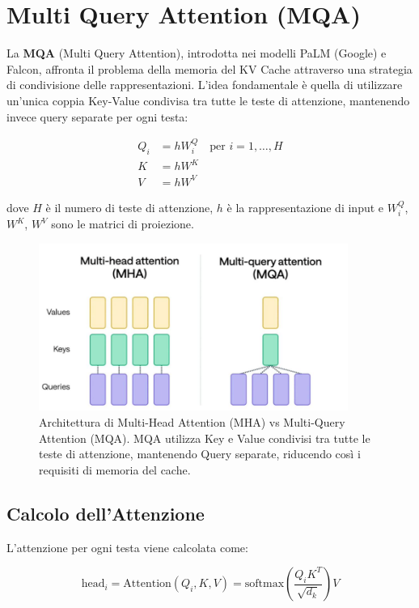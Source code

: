 \section{Multi Query Attention (MQA)}

La \textbf{MQA} (Multi Query Attention), introdotta nei modelli PaLM (Google) e Falcon, affronta il problema della memoria del KV Cache attraverso una strategia di condivisione delle rappresentazioni. L'idea fondamentale è quella di utilizzare un'unica coppia Key-Value condivisa tra tutte le teste di attenzione, mantenendo invece query separate per ogni testa:

\begin{align*}
Q_i &= h W_i^Q \quad \text{per } i = 1, \ldots, H \\
K &= h W^K \\
V &= h W^V
\end{align*}

dove $H$ è il numero di teste di attenzione, $h$ è la rappresentazione di input e $W_i^Q$, $W^K$, $W^V$ sono le matrici di proiezione.

\begin{figure}
    \centering
    \includegraphics[width=0.9\textwidth]{figure/mha_vs_mqa_comparison.png}
    \caption{Architettura di Multi-Head Attention (MHA) vs Multi-Query Attention (MQA). MQA utilizza Key e Value condivisi tra tutte le teste di attenzione, mantenendo Query separate, riducendo così i requisiti di memoria del cache.}
    \label{fig:mha_vs_mqa}
\end{figure}

\subsection{Calcolo dell'Attenzione}
L'attenzione per ogni testa viene calcolata come:

\begin{equation}
    \text{head}_i = \text{Attention}(Q_i, K, V) = \text{softmax}\left(\frac{Q_i K^T}{\sqrt{d_k}}\right) V
\end{equation}

